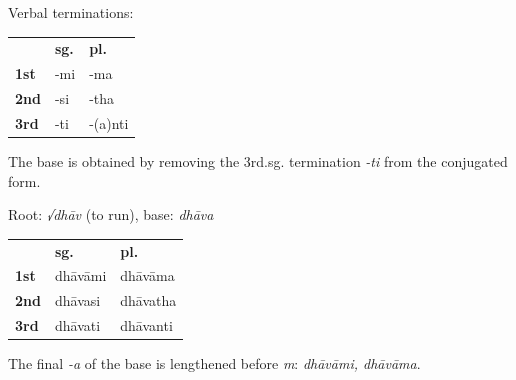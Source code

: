 \documentclass[11pt,oneside]{memoir}
\begin{document}
\bigskip
{\centering\par
\begin{multicols}{2}

Verbal terminations:

\begin{center}
\begin{tabular}{lll}
 & \textbf{sg.} & \textbf{pl.}\\
\textbf{1st} & -mi & -ma\\
\textbf{2nd} & -si & -tha\\
\textbf{3rd} & -ti & -(a)nti\\
\end{tabular}
\end{center}

The base is obtained by removing the 3rd.sg. termination \emph{-ti} from the conjugated form.

\columnbreak

Root: \emph{√dhāv} (to run), base: \emph{dhāva}

\begin{center}
\begin{tabular}{lll}
 & \textbf{sg.} & \textbf{pl.}\\
\textbf{1st} & dhāvāmi & dhāvāma\\
\textbf{2nd} & dhāvasi & dhāvatha\\
\textbf{3rd} & dhāvati & dhāvanti\\
\end{tabular}
\end{center}

The final \emph{-a} of the base is lengthened before \emph{m}: \emph{dhāvāmi, dhāvāma}.

\end{multicols}
\par}
\bigskip
\end{document}
